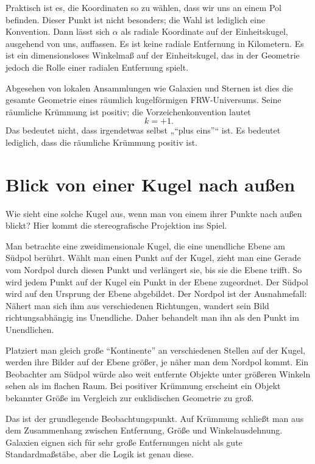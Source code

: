 Praktisch ist es, die Koordinaten so zu wählen, dass wir uns an einem Pol befinden. Dieser Punkt ist nicht besonders; die Wahl ist lediglich eine Konvention. Dann lässt sich \(\alpha\) als radiale Koordinate auf der Einheitskugel, ausgehend von uns, auffassen. Es ist keine radiale Entfernung in Kilometern. Es ist ein dimensionsloses Winkelmaß auf der Einheitskugel, das in der Geometrie jedoch die Rolle einer radialen Entfernung spielt.

Abgesehen von lokalen Ansammlungen wie Galaxien und Sternen ist dies die gesamte Geometrie eines räumlich kugelförmigen FRW-Universums. Seine räumliche Krümmung ist positiv; die Vorzeichenkonvention lautet
\begin{equation}
k=+1.
\end{equation}
Das bedeutet nicht, dass irgendetwas selbst „``plus eins''“ ist. Es bedeutet lediglich, dass die räumliche Krümmung positiv ist.

\section{Blick von einer Kugel nach außen}

Wie sieht eine solche Kugel aus, wenn man von einem ihrer Punkte nach außen blickt? Hier kommt die stereografische Projektion ins Spiel.

Man betrachte eine zweidimensionale Kugel, die eine unendliche Ebene am Südpol berührt. Wählt man einen Punkt auf der Kugel, zieht man eine Gerade vom Nordpol durch diesen Punkt und verlängert sie, bis sie die Ebene trifft. So wird jedem Punkt auf der Kugel ein Punkt in der Ebene zugeordnet. Der Südpol wird auf den Ursprung der Ebene abgebildet. Der Nordpol ist der Ausnahmefall: Nähert man sich ihm aus verschiedenen Richtungen, wandert sein Bild richtungsabhängig ins Unendliche. Daher behandelt man ihn als den Punkt im Unendlichen.

Platziert man gleich große ``Kontinente'' an verschiedenen Stellen auf der Kugel, werden ihre Bilder auf der Ebene größer, je näher man dem Nordpol kommt. Ein Beobachter am Südpol würde also weit entfernte Objekte unter größeren Winkeln sehen als im flachen Raum. Bei positiver Krümmung erscheint ein Objekt bekannter Größe im Vergleich zur euklidischen Geometrie zu groß.

Das ist der grundlegende Beobachtungspunkt. Auf Krümmung schließt man aus dem Zusammenhang zwischen Entfernung, Größe und Winkelausdehnung. Galaxien eignen sich für sehr große Entfernungen nicht als gute Standardmaßstäbe, aber die Logik ist genau diese.


